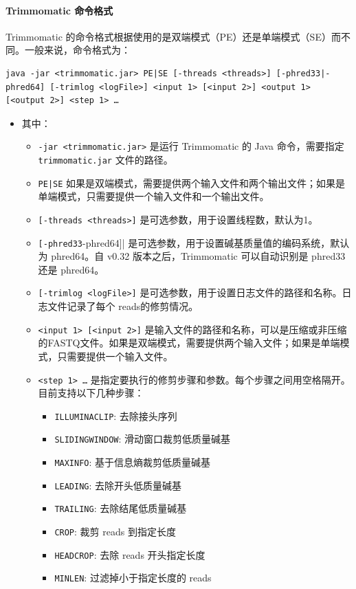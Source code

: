 \documentclass[UTF8]{ctexart}
\begin{document}
\paragraph*{Trimmomatic 命令格式}

Trimmomatic 的命令格式根据使用的是双端模式（PE）还是单端模式（SE）而不同。一般来说，命令格式为：

\begin{lstlisting}
java -jar <trimmomatic.jar> PE|SE [-threads <threads>] [-phred33|-phred64] [-trimlog <logFile>] <input 1> [<input 2>] <output 1> [<output 2>] <step 1> …
\end{lstlisting}

\begin{itemize}
	\item 其中：
	\begin{itemize}
		\item \verb|-jar <trimmomatic.jar>| 是运行 Trimmomatic 的 Java 命令，需要指定\\ \verb|trimmomatic.jar| 文件的路径。
		\item \verb!PE|SE! 如果是双端模式，需要提供两个输入文件和两个输出文件；如果是单端模式，只需要提供一个输入文件和一个输出文件。
		\item \verb|[-threads <threads>]| 是可选参数，用于设置线程数，默认为1。
		\item \verb|[-phred33|-phred64]| 是可选参数，用于设置碱基质量值的编码系统，默认为 phred64。自 v0.32 版本之后，Trimmomatic 可以自动识别是 phred33 还是 phred64。
		\item \verb|[-trimlog <logFile>]| 是可选参数，用于设置日志文件的路径和名称。日志文件记录了每个 reads的修剪情况。 
		\item \verb|<input 1> [<input 2>]| 是输入文件的路径和名称，可以是压缩或非压缩的FASTQ文件。如果是双端模式，需要提供两个输入文件；如果是单端模式，只需要提供一个输入文件。
		\item \verb|<step 1> …| 是指定要执行的修剪步骤和参数。每个步骤之间用空格隔开。目前支持以下几种步骤：
		\begin{itemize}
			\item \verb|ILLUMINACLIP|: 去除接头序列
			\item \verb|SLIDINGWINDOW|: 滑动窗口裁剪低质量碱基
			\item \verb|MAXINFO|: 基于信息熵裁剪低质量碱基
			\item \verb|LEADING|: 去除开头低质量碱基
			\item \verb|TRAILING|: 去除结尾低质量碱基
			\item \verb|CROP|: 裁剪 reads 到指定长度
			\item \verb|HEADCROP|: 去除 reads 开头指定长度
			\item \verb|MINLEN|: 过滤掉小于指定长度的 reads
		\end{itemize}
	\end{itemize}
\end{itemize}
\end{document}
